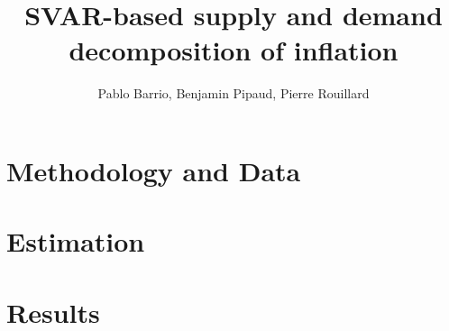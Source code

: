 \documentclass[letterpaper,12pt,leqno]{article}
\begin{document}
\title{SVAR-based supply and demand decomposition of inflation}
\author{Pablo Barrio, Benjamin Pipaud, Pierre Rouillard}
\date{}

\begin{titlepage}
\maketitle
\tableofcontents
\end{titlepage}

\section{Methodology and Data}\label{sec:sec1}

\section{Estimation}\label{sec:sec2}

\section{Results}\label{sec:sec3}

\end{document}
